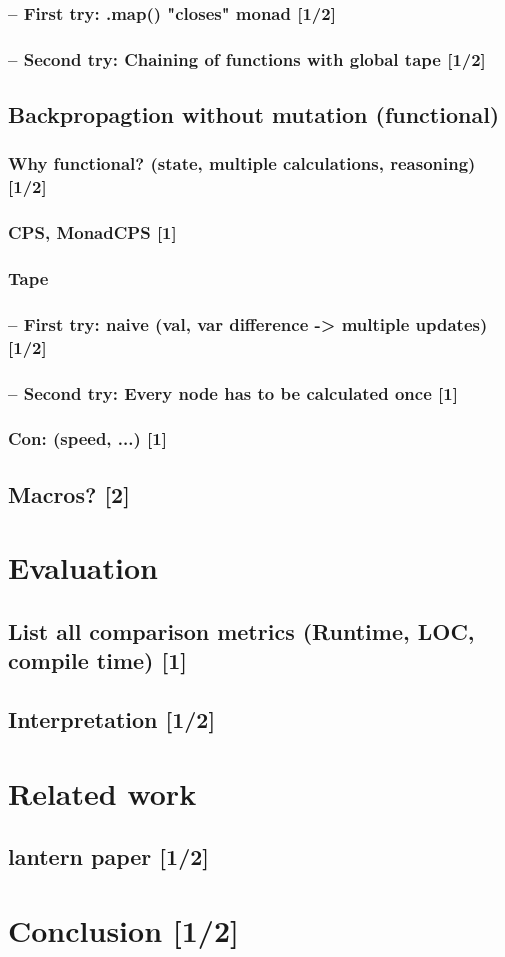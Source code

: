 \documentclass[
	english,
	class=report,custommargins=true,marginpar=false,
	accentcolor=9c,%
	thesis={type=bachelor},%
	fontsize=11pt,%
]{tudapub}
\begin{document}
			\subsection{ -- First try: .map() "closes" monad [1/2] }
			\subsection{ -- Second try: Chaining of functions with global tape [1/2]}

	\section{Backpropagtion without mutation (functional)}
		\subsection{Why functional? (state, multiple calculations, reasoning) [1/2]}
		\subsection{CPS, MonadCPS [1]}
		\subsection{Tape}
			\subsection{ -- First try: naive (val, var difference -> multiple updates) [1/2]}
			\subsection{ -- Second try: Every node has to be calculated once [1]}
		\subsection{Con: (speed, ...) [1]}

    \section{Macros? [2]}


\chapter{Evaluation}
	\section{List all comparison metrics (Runtime, LOC, compile time) [1]}
	\section{Interpretation [1/2]}
\chapter{Related work}
	\section{lantern paper [1/2]}

\chapter{Conclusion [1/2]}



\printbibliography
\end{document}
